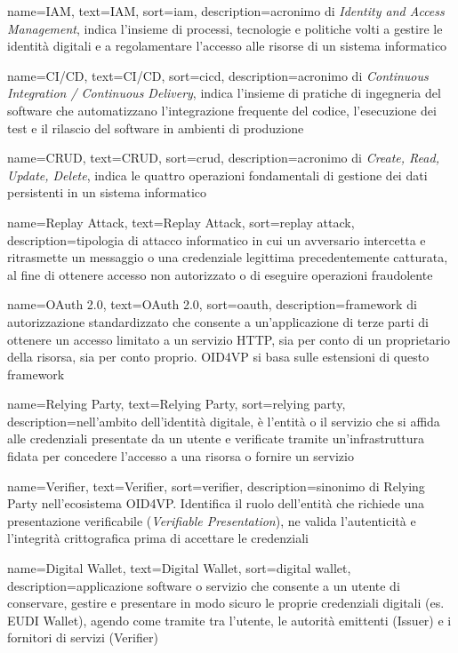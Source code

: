 {
    name=IAM,
    text=IAM,
    sort=iam,
    description={acronimo di \emph{Identity and Access Management}, indica l'insieme di processi, tecnologie e politiche volti a gestire le identità digitali e a regolamentare l'accesso alle risorse di un sistema informatico}
}

{
    name=CI/CD,
    text=CI/CD,
    sort=cicd,
    description={acronimo di \emph{Continuous Integration / Continuous Delivery}, indica l'insieme di pratiche di ingegneria del software che automatizzano l'integrazione frequente del codice, l'esecuzione dei test e il rilascio del software in ambienti di produzione}
}


{
    name=CRUD,
    text=CRUD,
    sort=crud,
    description={acronimo di \emph{Create, Read, Update, Delete}, indica le quattro operazioni fondamentali di gestione dei dati persistenti in un sistema informatico}
}

{
    name=Replay Attack,
    text=Replay Attack,
    sort=replay attack,
    description={tipologia di attacco informatico in cui un avversario intercetta e ritrasmette un messaggio o una credenziale legittima precedentemente catturata, al fine di ottenere accesso non autorizzato o di eseguire operazioni fraudolente}
}

{
    name=OAuth 2.0,
    text=OAuth 2.0,
    sort=oauth,
    description={framework di autorizzazione standardizzato che consente a un'applicazione di terze parti di ottenere un accesso limitato a un servizio HTTP, sia per conto di un proprietario della risorsa, sia per conto proprio. OID4VP si basa sulle estensioni di questo framework}
}

{
    name=Relying Party,
    text=Relying Party,
    sort=relying party,
    description={nell'ambito dell'identità digitale, è l'entità o il servizio che si affida alle credenziali presentate da un utente e verificate tramite un'infrastruttura fidata per concedere l'accesso a una risorsa o fornire un servizio}
}

{
    name=Verifier,
    text=Verifier,
    sort=verifier,
    description={sinonimo di Relying Party nell'ecosistema OID4VP. Identifica il ruolo dell'entità che richiede una presentazione verificabile (\emph{Verifiable Presentation}), ne valida l'autenticità e l'integrità crittografica prima di accettare le credenziali}
}

{
    name=Digital Wallet,
    text=Digital Wallet,
    sort=digital wallet,
    description={applicazione software o servizio che consente a un utente di conservare, gestire e presentare in modo sicuro le proprie credenziali digitali (es. EUDI Wallet), agendo come tramite tra l'utente, le autorità emittenti (Issuer) e i fornitori di servizi (Verifier)}
}
